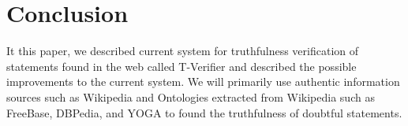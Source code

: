 \documentclass[11pt]{article}
\begin{document}
\section{Conclusion}
It this paper, we described current system for truthfulness verification of statements found in the web called T-Verifier and described the possible improvements to the current system. We will primarily use authentic information sources such as Wikipedia and Ontologies extracted from Wikipedia such as FreeBase, DBPedia, and YOGA to found the truthfulness of doubtful statements.  




\end{document}
